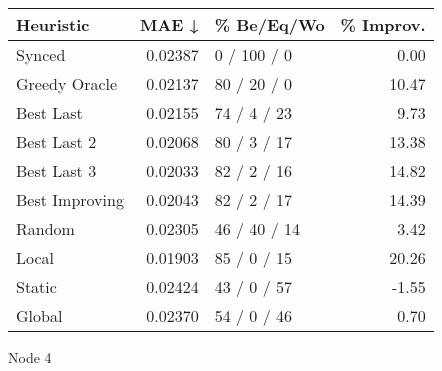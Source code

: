 \begin{tabular}{lrlr}
\toprule
\textbf{Heuristic} & \textbf{MAE ↓} & \textbf{\% Be/Eq/Wo} & \textbf{\% Improv.} \\
\midrule
            Synced &        0.02387 &          0 / 100 / 0 &                0.00 \\
     Greedy Oracle &        0.02137 &          80 / 20 / 0 &               10.47 \\
         Best Last &        0.02155 &          74 / 4 / 23 &                9.73 \\
       Best Last 2 &        0.02068 &          80 / 3 / 17 &               13.38 \\
       Best Last 3 &        0.02033 &          82 / 2 / 16 &               14.82 \\
    Best Improving &        0.02043 &          82 / 2 / 17 &               14.39 \\
            Random &        0.02305 &         46 / 40 / 14 &                3.42 \\
             Local &        0.01903 &          85 / 0 / 15 &               20.26 \\
            Static &        0.02424 &          43 / 0 / 57 &               -1.55 \\
            Global &        0.02370 &          54 / 0 / 46 &                0.70 \\
\bottomrule
\end{tabular}
\caption{Node 4}
\label{tab:non_lr01_le1_bs4_4}
